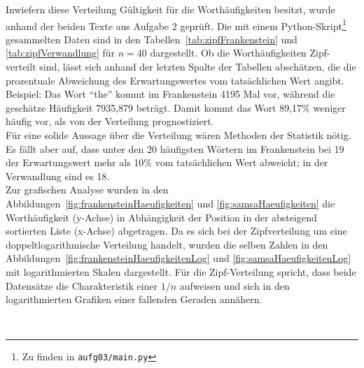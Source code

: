Inwiefern diese Verteilung Gültigkeit für die Worthäufigkeiten besitzt, wurde 
anhand der beiden Texte aus Aufgabe 2 geprüft. Die mit einem 
Python-Skript\footnote{Zu finden in \tt{aufg03/main.py}} gesammelten Daten sind 
in den Tabellen~\ref{tab:zipfFrankenstein} und \ref{tab:zipfVerwandlung}  für 
$n=40$ dargestellt. Ob die Worthäufigkeiten Zipf-verteilt sind, lässt sich 
anhand der letzten Spalte der Tabellen abschätzen, die die prozentuale 
Abweichung des Erwartungswertes vom tatsächlichen Wert angibt. Beispiel: Das 
Wort "`the"' kommt im Frankenstein 4195 Mal vor, während die geschätze 
Häufigkeit 7935,879 beträgt. Damit kommt das Wort 89,17\% weniger häufig vor, 
als von der Verteilung prognostiziert. \\
Für eine solide Aussage über die Verteilung wären Methoden der Statistik nötig. 
Es fällt aber auf, dass unter den 20 häufigsten Wörtern im Frankenstein bei 19 
der Erwartungswert mehr als 10\% vom tatsächlichen Wert abweicht; in der 
Verwandlung sind es 18. \\
Zur grafischen Analyse wurden in den 
Abbildungen~\ref{fig:frankensteinHaeufigkeiten} und 
\ref{fig:samsaHaeufigkeiten} die Worthäufigkeit (y-Achse) in Abhängigkeit der 
Position in der absteigend sortierten Liste (x-Achse) abgetragen. Da es sich 
bei der Zipfverteilung um eine doppeltlogarithmische Verteilung  handelt, 
wurden die selben Zahlen in den 
Abbildungen~\ref{fig:frankensteinHaeufigkeitenLog} und 
\ref{fig:samsaHaeufigkeitenLog} mit logarithmierten Skalen dargestellt. Für die 
Zipf-Verteilung spricht, dass beide Datensätze die Charakteristik einer $1/n$ 
aufweisen und sich in den logarithmierten Grafiken einer fallenden Geraden 
annähern.

\hfill \\
\newpage

